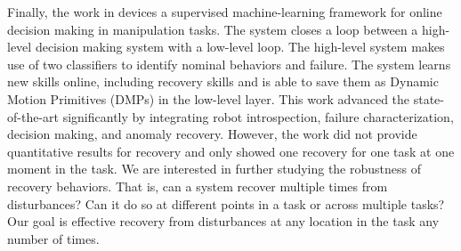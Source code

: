 \documentclass[letterpaper, 10 pt, conference]{ieeeconf}  %
\begin{document}
Finally, the work in \cite{2015RSS-Kappler-DateDrivenOnlineDecisionMakingManipu} devices a supervised machine-learning framework for online decision making in manipulation tasks. The system closes a loop between a high-level decision making system with a low-level loop. The high-level system makes use of two classifiers to identify nominal behaviors and failure. The system learns new skills online, including recovery skills and is able to save them as Dynamic Motion Primitives (DMPs) in the low-level layer. This work advanced the state-of-the-art significantly by integrating robot introspection, failure characterization, decision making, and anomaly recovery. However, the work did not provide quantitative results for recovery and only showed one recovery for one task at one moment in the task. We are interested in further studying the robustness of recovery behaviors. That is, can a system recover multiple times from disturbances? Can it do so at different points in a task or across multiple tasks? Our goal is effective recovery from disturbances at any location in the task any number of times.
\end{document}
